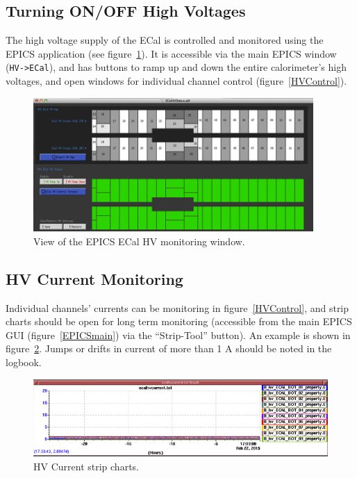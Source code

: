 \documentclass[12pt]{article}
\begin{document}
      \subsection{Turning ON/OFF High Voltages}

      The high voltage supply of the ECal is controlled and monitored using the EPICS application (see figure~\ref{HV}).  It is accessible via the main EPICS window (\texttt{HV->ECal}), and has buttons to ramp up and down the entire calorimeter's high voltages, and open windows for individual channel control (figure~\ref{HVControl}).

\begin{figure}[htbp]
\center
\includegraphics[width=0.95\textwidth]{pics/ecalhvmongui.png}
\caption{\small \label{HV} View of the EPICS ECal HV monitoring window.}
\end{figure}

   \subsection{HV Current Monitoring}
   Individual channels' currents can be monitoring in figure~\ref{HVControl}, and strip charts should be open for long term monitoring (accessible from the main EPICS GUI (figure~\ref{EPICSmain}) via the ``Strip-Tool'' button).  An example is shown in figure~\ref{fig:hvcurrentstrips}.  Jumps or drifts in current of more than 1 A should be noted in the logbook.

   \begin{figure}[htbp]\centering
       \includegraphics[width=16cm]{pics/hvcurrentstrip.png}
       \caption{HV Current strip charts.\label{fig:hvcurrentstrips}}
   \end{figure}
\end{document}
